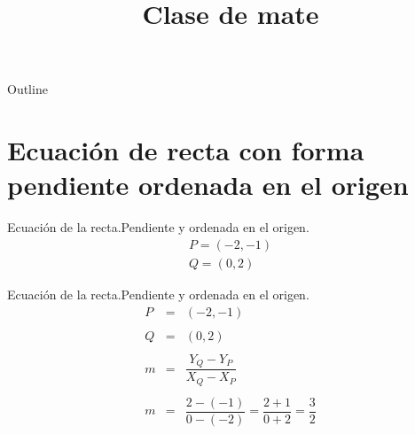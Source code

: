 \documentclass{beamer}
\title[Clase de mate] %
{Clase de mate}
\date[Short Occasion] %
\begin{document}
\begin{frame}
  \titlepage
\end{frame}

\begin{frame}{Outline}
  \tableofcontents
\end{frame}




\section{Ecuación de recta con forma pendiente ordenada en el origen}


\begin{frame}{Ecuación de la recta.}{Pendiente y ordenada en el origen.}
\begin{eqnarray}
P = (-2,-1)\\
Q = (0, 2)
\end{eqnarray}
\end{frame}

\begin{frame}{Ecuación de la recta.}{Pendiente y ordenada en el origen.}
\begin{equation}
\begin{array}{rcl}
P & = & (-2,-1)\\
\\
Q & = & (0, 2)\\
\\
m & = & \dfrac{Y_Q-Y_P}{X_Q-X_P}\\
\\
m & = & \dfrac{2-(-1)}{0-(-2)}=\dfrac{2+1}{0+2}=\dfrac{3}{2}
\end{array}
\end{equation}
\end{frame}
\end{document}
